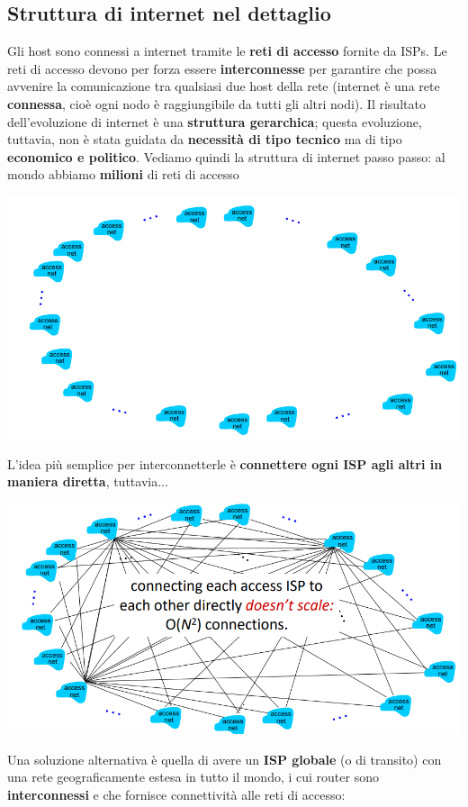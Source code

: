 \documentclass[12pt]{article}
\begin{document}
\subsection{Struttura di internet nel dettaglio}
Gli host sono connessi a internet tramite le \textbf{reti di accesso} fornite da ISPs.
Le reti di accesso devono per forza essere \textbf{interconnesse} per garantire che possa avvenire la comunicazione tra qualsiasi due host della rete (internet è una rete \textbf{connessa}, cioè ogni nodo è raggiungibile da tutti gli altri nodi).
Il risultato dell'evoluzione di internet è una \textbf{struttura gerarchica}; questa evoluzione, tuttavia, non è stata guidata da \textbf{necessità di tipo tecnico} ma di tipo \textbf{economico e politico}.
Vediamo quindi la struttura di internet passo passo: al mondo abbiamo \textbf{milioni} di reti di accesso
\begin{center}
    \includegraphics[width =0.85\linewidth]{Images/10.PNG}
\end{center}
L'idea più semplice per interconnetterle è \textbf{connettere ogni ISP agli altri in maniera diretta}, tuttavia...
\begin{center}
    \includegraphics[width =0.85\linewidth]{Images/11.PNG}
\end{center}
Una soluzione alternativa è quella di avere un \textbf{ISP globale} (o di transito) con una rete geograficamente estesa in tutto il mondo, i cui router sono \textbf{interconnessi} e che fornisce connettività alle reti di accesso:
\end{document}
